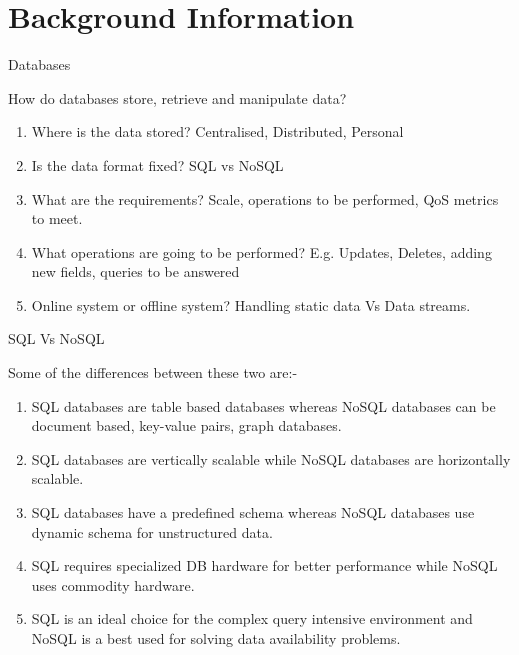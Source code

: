 
\section{Background Information}
\frame{\sectionpage}

\begin{frame}{Databases}
    \begin{alertblock}{How do databases store, retrieve and manipulate data?}
        \begin{enumerate}[<+->]
            \item Where is the data stored? Centralised, Distributed, Personal
            \item Is the data format fixed? SQL vs NoSQL
            \item What are the requirements? Scale, operations to be performed, QoS metrics to meet.
            \item What operations are going to be performed? E.g. Updates, Deletes, adding new fields, queries to be answered
            \item Online system or offline system? Handling static data Vs Data streams.
        \end{enumerate}
    \end{alertblock}
\end{frame}

\begin{frame}{SQL Vs NoSQL}
    \begin{alertblock}{Some of the differences between these two are:-}
        \begin{enumerate}[<+->]
            \item SQL databases are table based databases whereas NoSQL databases can be document based, key-value pairs, graph databases.
            \item SQL databases are vertically scalable while NoSQL databases are horizontally scalable.
            \item SQL databases have a predefined schema whereas NoSQL databases use dynamic schema for unstructured data.
            \item SQL requires specialized DB hardware for better performance while NoSQL uses commodity hardware.
            \item SQL is an ideal choice for the complex query intensive environment and NoSQL is a best used for solving data availability problems. 
        \end{enumerate}
    \end{alertblock}
\end{frame}

